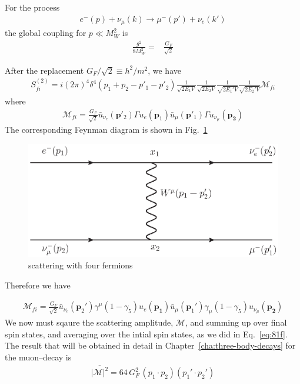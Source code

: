 For the process 
\begin{align}
  e^-(p)+\nu_\mu(k)\to\mu^-(p')+\nu_e(k')
\end{align}
the global coupling for $p\ll M_W^2$ is
\begin{align}
  \frac{g^2}{8M_W^2}=&\frac{G_F}{\sqrt{2}}
\end{align}

After the replacement $G_F/\sqrt{2}\equiv h^2/m^2$, we have
\begin{align}
  \label{eq:101f}
  S^{(2)}_{fi}=i(2\pi)^4\delta^{4}\left(p_1+p_2-p'_1-p'_2\right)
  \frac{1}{\sqrt{2E_1 V}}\frac{1}{\sqrt{2E_2 V}}
  \frac{1}{\sqrt{2E_1' V}}\frac{1}{\sqrt{2E_2' V}}
  \mathcal{M}_{fi}
\end{align}
where
\begin{align}
  \mathcal{M}_{fi}=\frac{G_F}{\sqrt{2}}
\bar{u}_{\nu_e}(\mathbf{p}'_2)\Gamma u_e(\mathbf{p}_1)\bar{u}_\mu(\mathbf{p}'_1)\Gamma u_{\nu_\mu}(\mathbf{p_2})
\end{align}
The corresponding Feynman diagram is shown in Fig.~\ref{fig:sw}
\begin{figure} %
  \centering %
  \includegraphics{scatteringw} %
  \caption{scattering with four fermions} %
  \label{fig:sw} %
\end{figure} %
Therefore we have

\begin{align}
  \mathcal{M}_{fi}=\frac{G_F}{\sqrt{2}}
\bar{u}_{\nu_e}(\mathbf{p}_2')\gamma^\mu(1-\gamma_5)u_e(\mathbf{p_1})
\bar{u}_\mu(\mathbf{p}_1')\gamma_\mu(1-\gamma_5)u_{\nu_\mu}(\mathbf{p_2})
\end{align}
We now must sqaure the scattering amplitude, $\mathcal{M}$, and summing up over final spin states, and averaging over the intial spin states, as we did in Eq.~\eqref{eq:81f}. The result that will be obtained in detail in Chapter~\ref{cha:three-body-decays} for the muon--decay is
\begin{align}
  \label{eq:102f}
  \overline{|\mathcal{M}|^2}=64\,G_F^2\,(p_1\cdot p_2)(p_1'\cdot p_2')
\end{align}

